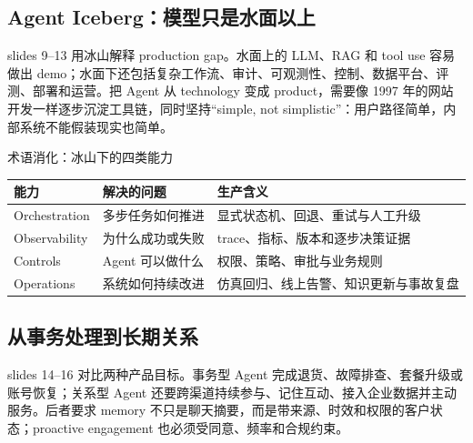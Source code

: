 \subsection{Agent Iceberg：模型只是水面以上}

slides 9--13 用冰山解释 production gap。水面上的 LLM、RAG 和 tool use 容易做出 demo；水面下还包括复杂工作流、审计、可观测性、控制、数据平台、评测、部署和运营。把 Agent 从 technology 变成 product，需要像 1997 年的网站开发一样逐步沉淀工具链，同时坚持“simple, not simplistic”：用户路径简单，内部系统不能假装现实也简单。


\begin{knowledgebox}{术语消化：冰山下的四类能力}
\begin{tabular}{p{2.8cm}p{4.2cm}p{5.2cm}}
\toprule
\textbf{能力} & \textbf{解决的问题} & \textbf{生产含义} \\
\midrule
Orchestration & 多步任务如何推进 & 显式状态机、回退、重试与人工升级 \\
Observability & 为什么成功或失败 & trace、指标、版本和逐步决策证据 \\
Controls & Agent 可以做什么 & 权限、策略、审批与业务规则 \\
Operations & 系统如何持续改进 & 仿真回归、线上告警、知识更新与事故复盘 \\
\bottomrule
\end{tabular}
\end{knowledgebox}

\subsection{从事务处理到长期关系}

slides 14--16 对比两种产品目标。事务型 Agent 完成退货、故障排查、套餐升级或账号恢复；关系型 Agent 还要跨渠道持续参与、记住互动、接入企业数据并主动服务。后者要求 memory 不只是聊天摘要，而是带来源、时效和权限的客户状态；proactive engagement 也必须受同意、频率和合规约束。


